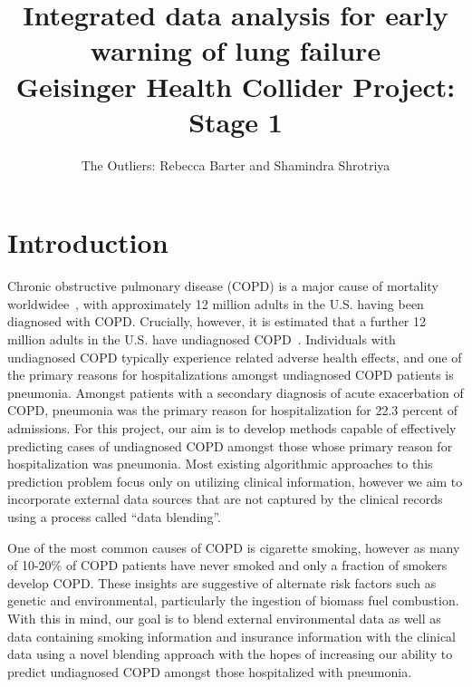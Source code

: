 \documentclass{article}
\title{Integrated data analysis for early warning of lung failure \\ \large{Geisinger Health Collider Project: Stage 1}}
\author{The Outliers: Rebecca Barter and Shamindra Shrotriya}
\begin{document}
\maketitle


\section{Introduction}

Chronic obstructive pulmonary disease (COPD) is a major cause of mortality worldwidee~\cite{lozano_global_2012}, with approximately 12 million adults in the U.S. having been diagnosed with COPD. Crucially, however, it is estimated that a further 12 million adults in the U.S. have undiagnosed COPD~\cite{nih_chronic_2010}. Individuals with undiagnosed COPD typically experience related adverse health effects, and one of the primary reasons for hospitalizations amongst undiagnosed COPD patients is pneumonia. Amongst patients with a secondary diagnosis of acute exacerbation of COPD, pneumonia was the primary reason for hospitalization for 22.3 percent of admissions. For this project, our aim is to develop methods capable of effectively predicting cases of undiagnosed COPD amongst those whose primary reason for hospitalization was pneumonia. Most existing algorithmic approaches to this prediction problem focus only on utilizing clinical information, however we aim to incorporate external data sources that are not captured by the clinical records using a process called ``data blending''. 

One of the most common causes of COPD is cigarette smoking, however as many of 10-20\% of COPD patients have never smoked and only a fraction of smokers develop COPD. These insights are suggestive of alternate risk factors such as genetic and environmental, particularly the ingestion of biomass fuel combustion. With this in mind, our goal is to blend external environmental data as well as data containing smoking information and insurance information with the clinical data using a novel blending approach with the hopes of increasing our ability to predict undiagnosed COPD amongst those hospitalized with pneumonia. 

%
\end{document}
